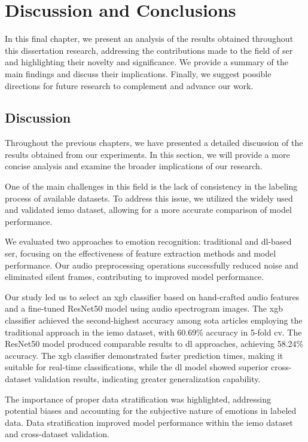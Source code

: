 \chapter{Discussion and Conclusions}
\label{chapter:conc}

In this final chapter, we present an analysis of the results obtained throughout this dissertation research, addressing the contributions made to the field of \ac{ser} and highlighting their novelty and significance. We provide a summary of the main findings and discuss their implications. Finally, we suggest possible directions for future research to complement and advance our work.

\section{Discussion}

Throughout the previous chapters, we have presented a detailed discussion of the results obtained from our experiments. In this section, we will provide a more concise analysis and examine the broader implications of our research.

One of the main challenges in this field is the lack of consistency in the labeling process of available datasets. To address this issue, we utilized the widely used and validated \ac{iemo} dataset, allowing for a more accurate comparison of model performance.

We evaluated two approaches to emotion recognition: traditional and \ac{dl}-based \ac{ser}, focusing on the effectiveness of feature extraction methods and model performance. Our audio preprocessing operations successfully reduced noise and eliminated silent frames, contributing to improved model performance.

Our study led us to select an \ac{xgb} classifier based on hand-crafted audio features and a fine-tuned ResNet50 model using audio spectrogram images. The \ac{xgb} classifier achieved the second-highest accuracy among \ac{sota} articles employing the traditional approach in the \ac{iemo} dataset, with 60.69\% accuracy in 5-fold \ac{cv}. The ResNet50 model produced comparable results to \ac{dl} approaches, achieving 58.24\% accuracy. The \ac{xgb} classifier demonstrated faster prediction times, making it suitable for real-time classifications, while the \ac{dl} model showed superior cross-dataset validation results, indicating greater generalization capability.

The importance of proper data stratification was highlighted, addressing potential biases and accounting for the subjective nature of emotions in labeled data. Data stratification improved model performance within the \ac{iemo} dataset and cross-dataset validation.

